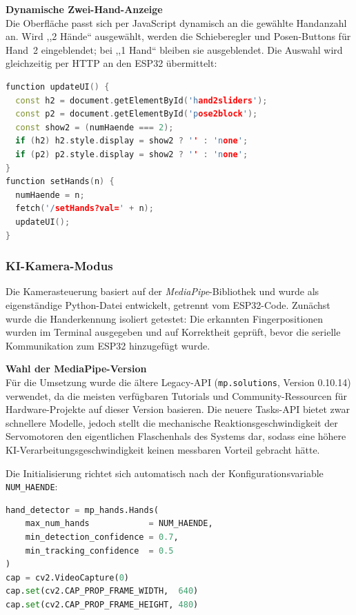 \documentclass[12pt,a4paper]{article}
\begin{document}
\vspace{0.5em}
\textbf{Dynamische Zwei-Hand-Anzeige} \\
Die Oberfläche passt sich per JavaScript dynamisch an die gewählte Handanzahl an. Wird ,,2 Hände`` ausgewählt, werden die Schieberegler und Posen-Buttons für Hand~2 eingeblendet; bei ,,1 Hand`` bleiben sie ausgeblendet. Die Auswahl wird gleichzeitig per HTTP an den ESP32 übermittelt:

\begin{lstlisting}[language=C++, caption={JavaScript auf der Website: Hand-2-Bereiche ein-/ausblenden}]
function updateUI() {
  const h2 = document.getElementById('hand2sliders');
  const p2 = document.getElementById('pose2block');
  const show2 = (numHaende === 2);
  if (h2) h2.style.display = show2 ? '' : 'none';
  if (p2) p2.style.display = show2 ? '' : 'none';
}
function setHands(n) {
  numHaende = n;
  fetch('/setHands?val=' + n);
  updateUI();
}
\end{lstlisting}

\subsubsection{KI-Kamera-Modus}

Die Kamerasteuerung basiert auf der \textit{MediaPipe}-Bibliothek und wurde als eigenständige Python-Datei entwickelt, getrennt vom ESP32-Code. Zunächst wurde die Handerkennung isoliert getestet: Die erkannten Fingerpositionen wurden im Terminal ausgegeben und auf Korrektheit geprüft, bevor die serielle Kommunikation zum ESP32 hinzugefügt wurde.

\vspace{0.5em}
\textbf{Wahl der MediaPipe-Version} \\
Für die Umsetzung wurde die ältere Legacy-API (\texttt{mp.solutions}, Version 0.10.14) verwendet, da die meisten verfügbaren Tutorials und Community-Ressourcen für Hardware-Projekte auf dieser Version basieren. Die neuere Tasks-API bietet zwar schnellere Modelle, jedoch stellt die mechanische Reaktionsgeschwindigkeit der Servomotoren den eigentlichen Flaschenhals des Systems dar, sodass eine höhere KI-Verarbeitungsgeschwindigkeit keinen messbaren Vorteil gebracht hätte.

Die Initialisierung richtet sich automatisch nach der Konfigurationsvariable \texttt{NUM\_HAENDE}:

\begin{lstlisting}[language=Python, caption={Initialisierung von MediaPipe und Webcam}]
hand_detector = mp_hands.Hands(
    max_num_hands            = NUM_HAENDE,
    min_detection_confidence = 0.7,
    min_tracking_confidence  = 0.5
)
cap = cv2.VideoCapture(0)
cap.set(cv2.CAP_PROP_FRAME_WIDTH,  640)
cap.set(cv2.CAP_PROP_FRAME_HEIGHT, 480)
\end{lstlisting}
\end{document}
